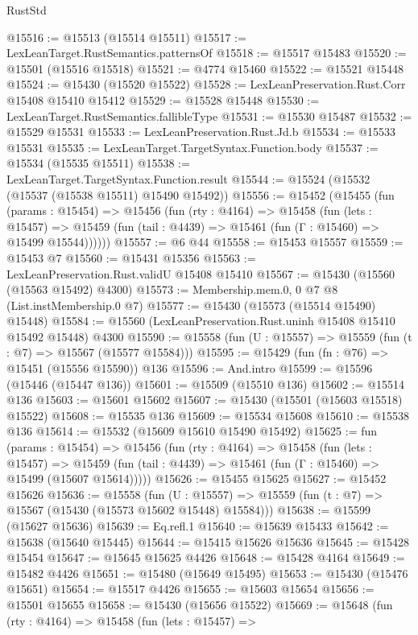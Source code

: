 \begin{lexlean}{RustStd}
\begin{coremodule}
{\begin{coremodule}
{{{{{{{{{{{{{{{{{{{{{{{{{{{{{{{{{{{{{{{{{{{{{{{{{{{{{{{{{{{{@15516 := @15513 (@15514 @15511)
@15517 := LexLeanTarget.RustSemantics.patternsOf
@15518 := @15517 @15483
@15520 := @15501 (@15516 @15518)
@15521 := @4774 @15460
@15522 := @15521 @15448
@15524 := @15430 (@15520 @15522)
@15528 := LexLeanPreservation.Rust.Corr @15408 @15410 @15412
@15529 := @15528 @15448
@15530 := LexLeanTarget.RustSemantics.fallibleType
@15531 := @15530 @15487
@15532 := @15529 @15531
@15533 := LexLeanPreservation.Rust.Jd.b
@15534 := @15533 @15531
@15535 := LexLeanTarget.TargetSyntax.Function.body
@15537 := @15534 (@15535 @15511)
@15538 := LexLeanTarget.TargetSyntax.Function.result
@15544 := @15524 (@15532 (@15537 (@15538 @15511) @15490 @15492))
@15556 := @15452
    (@15455
      (fun (params : @15454) =>
      @15456
        (fun (rty : @4164) =>
        @15458
          (fun (lets : @15457) =>
          @15459 (fun (tail : @4439) => @15461 (fun (Γ : @15460) => @15499 @15544))))))
@15557 := @6 @44
@15558 := @15453 @15557
@15559 := @15453 @7
@15560 := @15431 @15356
@15563 := LexLeanPreservation.Rust.validU @15408 @15410
@15567 := @15430 (@15560 (@15563 @15492) @4300)
@15573 := Membership.mem.{0, 0} @7 @8 (List.instMembership.{0} @7)
@15577 := @15430 (@15573 (@15514 @15490) @15448)
@15584 := @15560 (LexLeanPreservation.Rust.uninh @15408 @15410 @15492 @15448) @4300
@15590 := @15558 (fun (U : @15557) => @15559 (fun (t : @7) => @15567 (@15577 @15584)))
@15595 := @15429 (fun (fn : @76) => @15451 (@15556 @15590)) @136
@15596 := And.intro
@15599 := @15596 (@15446 (@15447 @136))
@15601 := @15509 (@15510 @136)
@15602 := @15514 @136
@15603 := @15601 @15602
@15607 := @15430 (@15501 (@15603 @15518) @15522)
@15608 := @15535 @136
@15609 := @15534 @15608
@15610 := @15538 @136
@15614 := @15532 (@15609 @15610 @15490 @15492)
@15625 := fun (params : @15454) =>
  @15456
    (fun (rty : @4164) =>
    @15458
      (fun (lets : @15457) =>
      @15459 (fun (tail : @4439) => @15461 (fun (Γ : @15460) => @15499 (@15607 @15614)))))
@15626 := @15455 @15625
@15627 := @15452 @15626
@15636 := @15558
    (fun (U : @15557) => @15559 (fun (t : @7) => @15567 (@15430 (@15573 @15602 @15448) @15584)))
@15638 := @15599 (@15627 @15636)
@15639 := Eq.refl.{1}
@15640 := @15639 @15433
@15642 := @15638 (@15640 @15445)
@15644 := @15415 @15626 @15636
@15645 := @15428 @15454
@15647 := @15645 @15625 @4426
@15648 := @15428 @4164
@15649 := @15482 @4426
@15651 := @15480 (@15649 @15495)
@15653 := @15430 (@15476 @15651)
@15654 := @15517 @4426
@15655 := @15603 @15654
@15656 := @15501 @15655
@15658 := @15430 (@15656 @15522)
@15669 := @15648
    (fun (rty : @4164) =>
    @15458
      (fun (lets : @15457) =>
}}}}}}}}}}}}}}}}}}}}}}}}}}}}}}}}}}}}}}}}}}}}}}}}}}}}}}}}}}}}
\end{coremodule}}
\end{coremodule}
\end{lexlean}
